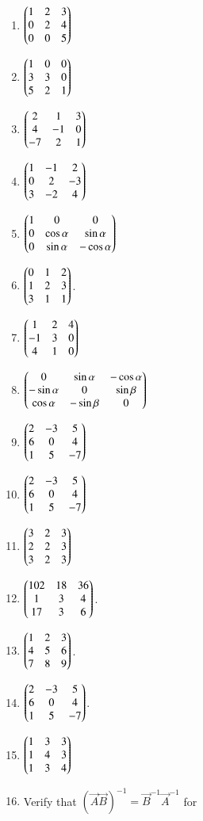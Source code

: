 \begin{enumerate}[label=\thesubsection.\arabic*,ref=\thesubsection.\theenumi]
\item $\begin{pmatrix}1 & 2 & 3 \\ 0 & 2 & 4 \\ 0 & 0 & 5\end{pmatrix}$
\item $\begin{pmatrix}1 & 0 & 0 \\ 3 & 3 & 0 \\ 5 & 2 & 1\end{pmatrix}$
\item $\begin{pmatrix}2 & 1 & 3 \\ 4 & -1 & 0 \\ -7 & 2 & 1\end{pmatrix}$
\item $\begin{pmatrix}1 & -1 & 2 \\ 0 & 2 & -3 \\ 3 & -2 & 4\end{pmatrix}$
\item $\begin{pmatrix}1 & 0 & 0 \\ 0 & \cos \alpha & \sin \alpha \\ 0 & \sin \alpha & -\cos \alpha\end{pmatrix}$ \label{prob:11}
\item 
$\begin{pmatrix}0&1&2\\1&2&3\\3&1&1\end{pmatrix}$. 
\item $\begin{pmatrix}1&2&4\\-1&3&0\\4&1&0\end{pmatrix}$
\item $ \begin{pmatrix}0&\sin\alpha&-\cos\alpha\\ -\sin\alpha&0&\sin\beta\\ \cos\alpha& -\sin\beta&0\end{pmatrix}$
\item $\begin{pmatrix}2 &- 3 & 5\\6 & 0 & 4\\1 & 5 & -7\end{pmatrix}$
\item $\begin{pmatrix}2&-3&5\\6&0&4\\1&5&-7 \end{pmatrix}$
\item $\begin{pmatrix}3&2&3\\2&2&3\\3&2&3\end{pmatrix}$
\item $\begin{pmatrix}102&18&36 \\ 1&3&4 \\ 17&3&6 \end{pmatrix}$.
\item $ \begin{pmatrix}1&2&3 \\4&5&6 \\7&8&9 \end{pmatrix}$.
\item $\begin{pmatrix} 2&-3&5 \\6&0&4 \\1&5&-7 \end{pmatrix}$. 
\item $\begin{pmatrix}1&3&3 \\1&4&3 \\ 1&3&4\end{pmatrix}$
\item Verify that $(\vec{A}\vec{B})^{-1}=\vec{B}^{-1} \vec{A}^{-1}$ for

\end{enumerate}
